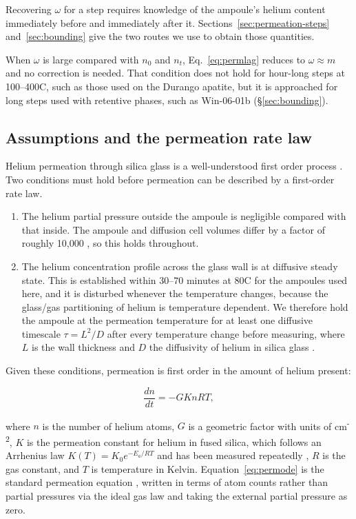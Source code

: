 Recovering $\omega$ for a step requires knowledge of the ampoule's helium content immediately before and immediately after it. Sections~\ref{sec:permeation-steps} and~\ref{sec:bounding} give the two routes we use to obtain those quantities.

When $\omega$ is large compared with $n_{0}$ and $n_{t}$, Eq.~\eqref{eq:permlag} reduces to $\omega \approx m$ and no correction is needed. That condition does not hold for hour-long steps at 100--400\textdegree C, such as those used on the Durango apatite, but it is approached for long steps used with retentive phases, such as Win-06-01b (\S\ref{sec:bounding}).

\subsection{Assumptions and the permeation rate law}\label{sec:assumptions}

Helium permeation through silica glass is a well-understood first order process \citep{norton1953,altemose1961,swets1961,masaryk1968}. Two conditions must hold before permeation can be described by a first-order rate law.

\begin{enumerate}
\item The helium partial pressure outside the ampoule is negligible compared with that inside. The ampoule and diffusion cell volumes differ by a factor of roughly 10,000 \citep{farley1999}, so this holds throughout.
\item The helium concentration profile across the glass wall is at diffusive steady state. This is established within 30--70 minutes at 80\textdegree C for the ampoules used here, and it is disturbed whenever the temperature changes, because the glass/gas partitioning of helium is temperature dependent. We therefore hold the ampoule at the permeation temperature for at least one diffusive timescale $\tau = L^{2}/D$ after every temperature change before measuring, where $L$ is the wall thickness and $D$ the diffusivity of helium in silica glass \citep{swets1961}.
\end{enumerate}

Given these conditions, permeation is first order in the amount of helium present:

\begin{equation}
\label{eq:permode}
\frac{dn}{dt} = -GKnRT ,
\end{equation}
 
where $n$ is the number of helium atoms, $G$ is a geometric factor with units of cm\textsuperscript{-2}, $K$ is the permeation constant for helium in fused silica, which follows an Arrhenius law $K(T) = K_{0}e^{-E_{a}/RT}$ and has been measured repeatedly \citep{norton1953,altemose1961,swets1961,masaryk1968}, $R$ is the gas constant, and $T$ is temperature in Kelvin. Equation~\eqref{eq:permode} is the standard permeation equation \citep{norton1953,altemose1961,swets1961,masaryk1968}, written in terms of atom counts rather than partial pressures via the ideal gas law and taking the external partial pressure as zero. 

